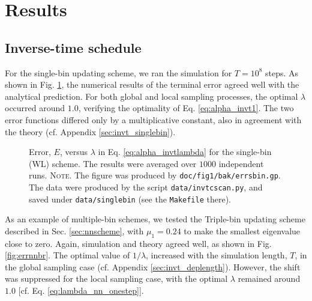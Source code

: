\documentclass[reprint, floatfix]{revtex4-1}
\newcommand{\note}[1]{{\color{DarkGreen}\footnotesize \textsc{Note.} #1}}
\begin{document}
\section{Results}


\subsection{\label{sec:results_invt}
Inverse-time schedule}



For the single-bin updating scheme, we
ran the simulation for $T = 10^8$ steps.
%
As shown in Fig. \ref{fig:errsbin},
the numerical results of the terminal error agreed well with
the analytical prediction.
%
For both global and local sampling processes,
the optimal $\lambda$ occurred around $1.0$,
verifying the optimality of Eq. \eqref{eq:alpha_invt1}.
%
%
The two error functions
differed only by a multiplicative constant,
also in agreement with the theory
(cf. Appendix \ref{sec:invt_singlebin}).
%


\begin{figure}[h]
\begin{center}
  \caption{
    \label{fig:errsbin}
    Error, $E$, versus $\lambda$
    in Eq. \eqref{eq:alpha_invtlambda}
    for the single-bin (WL) scheme.
    The results were averaged over $1000$ independent runs.
    \note{The figure was produced by \texttt{doc/fig1/bak/errsbin.gp}.
      The data were produced by the script \texttt{data/invtcscan.py},
      and saved under \texttt{data/singlebin}
      (see the \texttt{Makefile} there).
    }%
  }
\end{center}
\end{figure}


As an example of multiple-bin schemes,
we tested the Triple-bin updating scheme
described in Sec. \ref{sec:nnscheme},
%
with
$\mu_1 = 0.24$ to make the smallest eigenvalue
close to zero.
%
Again, simulation and theory agreed well,
as shown in Fig. \ref{fig:errnnbr}.
%
The optimal value of $1/\lambda$,
increased with the simulation length, $T$,
in the global sampling case
(cf. Appendix \ref{sec:invt_deplength}).
%
However, the shift was suppressed
for the local sampling case,
with the optimal $\lambda$ remained around $1.0$
[cf. Eq. \eqref{eq:lambda_nn_onestep}].
\end{document}
